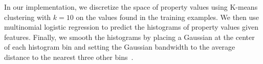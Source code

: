 In our implementation, we discretize the space of property values using K-means clustering with $k = 10$ on the values found in the training examples. We then use multinomial logistic regression to predict the histograms of property values given features.
Finally, we smooth the histograms by placing a Gaussian at the center of each histogram bin and setting the Gaussian bandwidth to the average distance to the nearest three other bins~\cite{ThemeEnhancement}.



%
%

